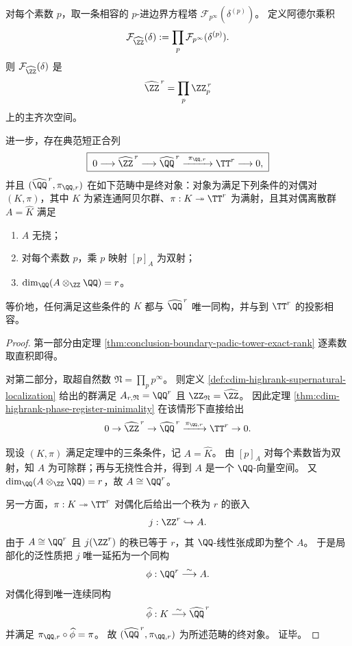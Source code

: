 \begin{theorem}[阿德尔拼接与通用连通包络]\label{thm:conclusion-boundary-adelic-solenoid-envelope}
对每个素数 \(p\)，取一条相容的 \(p\)-进边界方程塔
\(
\mathcal F_{p^\infty}(\delta^{(p)})
\)。
定义阿德尔乘积
\[
\mathcal F_{\widehat{\ZZ}}(\delta)
:=
\prod_{p}\mathcal F_{p^\infty}(\delta^{(p)}).
\]
则 \(\mathcal F_{\widehat{\ZZ}}(\delta)\) 是
\[
\widehat{\ZZ}^{\,r}
=
\prod_{p}\ZZ_p^{\,r}
\]
上的主齐次空间。

进一步，存在典范短正合列
\[
\boxed{\;
0\longrightarrow \widehat{\ZZ}^{\,r}
\longrightarrow \widehat{\QQ}^{\,r}
\xrightarrow{\ \pi_{\QQ,r}\ }
\TT^{r}
\longrightarrow 0,
\;}
\]
并且 \((\widehat{\QQ}^{\,r},\pi_{\QQ,r})\) 在如下范畴中是终对象：对象为满足下列条件的对偶对 \((K,\pi)\)，其中 \(K\) 为紧连通阿贝尔群、\(\pi:K\twoheadrightarrow\TT^r\) 为满射，且其对偶离散群 \(A=\widehat K\) 满足
\begin{enumerate}
  \item \(A\) 无挠；
  \item 对每个素数 \(p\)，乘 \(p\) 映射 \([p]_A\) 为双射；
  \item \(\dim_{\QQ}(A\otimes_{\ZZ}\QQ)=r\)。
\end{enumerate}
等价地，任何满足这些条件的 \(K\) 都与 \(\widehat{\QQ}^{\,r}\) 唯一同构，并与到 \(\TT^r\) 的投影相容。
\end{theorem}
\begin{proof}
第一部分由定理 \ref{thm:conclusion-boundary-padic-tower-exact-rank} 逐素数取直积即得。

对第二部分，取超自然数
\(
\mathfrak N=\prod_{p}p^\infty
\)。
则定义 \ref{def:cdim-highrank-supernatural-localization} 给出的群满足
\(
A_{r,\mathfrak N}=\QQ^r
\) 且
\(
\ZZ_{\mathfrak N}=\widehat{\ZZ}
\)。
因此定理 \ref{thm:cdim-highrank-phase-register-minimality} 在该情形下直接给出
\[
0\to \widehat{\ZZ}^{\,r}\to \widehat{\QQ}^{\,r}\xrightarrow{\pi_{\QQ,r}}\TT^r\to 0.
\]

现设 \((K,\pi)\) 满足定理中的三条条件，记 \(A=\widehat K\)。
由 \([p]_A\) 对每个素数皆为双射，知 \(A\) 为可除群；再与无挠性合并，得到 \(A\) 是一个 \(\QQ\)-向量空间。
又 \(\dim_{\QQ}(A\otimes_{\ZZ}\QQ)=r\)，故 \(A\cong \QQ^r\)。

另一方面，\(\pi:K\twoheadrightarrow\TT^r\) 对偶化后给出一个秩为 \(r\) 的嵌入
\[
j:\ZZ^r\hookrightarrow A.
\]
由于 \(A\cong\QQ^r\) 且 \(j(\ZZ^r)\) 的秩已等于 \(r\)，其 \(\QQ\)-线性张成即为整个 \(A\)。
于是局部化的泛性质把 \(j\) 唯一延拓为一个同构
\[
\phi:\QQ^r\overset{\sim}{\longrightarrow}A.
\]
对偶化得到唯一连续同构
\[
\widehat{\phi}:K\overset{\sim}{\longrightarrow}\widehat{\QQ}^{\,r}
\]
并满足 \(\pi_{\QQ,r}\circ \widehat{\phi}=\pi\)。
故 \((\widehat{\QQ}^{\,r},\pi_{\QQ,r})\) 为所述范畴的终对象。
证毕。
\end{proof}

